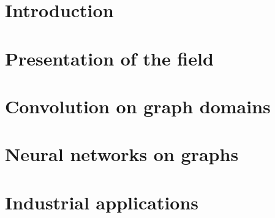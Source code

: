 \documentclass[12pt]{book}
\begin{document}

%
%


%
%

\dominitoc
\tableofcontents
\adjustmtc

%
%

\chapter*{Introduction}
\label{chp:int}
\todo{}
%

%
%

\chapter{Presentation of the field}

\vfill\minitoc\newpage

\newpage
\newpage
\newpage

%
%
\chapter{Convolution on graph domains}

\vfill\minitoc\newpage

\newpage
\newpage
\newpage
\newpage

%
%

\chapter{Neural networks on graphs}

\vfill\minitoc\newpage


\newpage
\newpage
\newpage

%
%

\chapter{Industrial applications}
\todo{}
\vfill\minitoc\newpage
\end{document}

